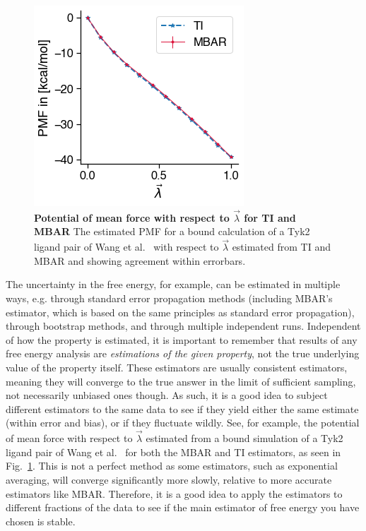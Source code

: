 \documentclass[9pt,bestpractices,pubversion]{livecoms}
\begin{document}
\begin{figure}
    \centering
    \includegraphics[width=0.8\linewidth]{figures/fig_pmf/pmf.png}
    \caption{{\bf Potential of mean force with respect to $\vec{\lambda}$ for TI and MBAR}
    The estimated PMF for a bound calculation of a Tyk2 ligand pair of Wang et al.~\cite{wang2015accurate} with respect to $\vec{\lambda}$ estimated from TI and MBAR and showing agreement within errorbars. 
    }
    \label{fig:pmf}
\end{figure}

The uncertainty in the free energy, for example, can be estimated in multiple ways, e.g. through standard error propagation methods (including MBAR's estimator, which is based on the same principles as standard error propagation), through bootstrap methods, and through multiple independent runs. 
Independent of how the property is estimated, it is important to remember that results of any free energy analysis are \textit{estimations of the given property}, not the true underlying value of the property itself. 
These estimators are usually consistent estimators, meaning they will converge to the true answer in the limit of sufficient sampling, not necessarily unbiased ones though.
As such, it is a good idea to subject different estimators to the same data to see if they yield either the same estimate (within error and bias), or if they fluctuate wildly. See, for example, the potential of mean force with respect to $\vec{\lambda}$ estimated from a bound simulation of a Tyk2 ligand pair of Wang et al.~\cite{wang2015accurate} for both the MBAR and TI estimators, as seen in Fig.~\ref{fig:pmf}.
This is not a perfect method as some estimators, such as exponential averaging, will converge significantly more slowly, relative to more accurate estimators like MBAR. 
Therefore, it is a good idea to apply the estimators to different fractions of the data to see if the main estimator of free energy you have chosen is stable.
\end{document}
